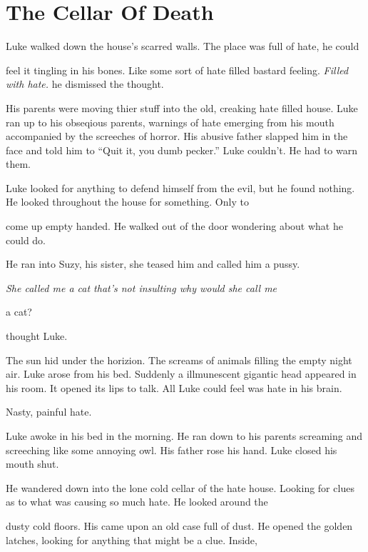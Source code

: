 \chapter{The Cellar Of Death}


Luke walked down the house's scarred walls. The place was full of
hate, he could

feel it tingling in his bones. Like some sort of hate filled
bastard feeling. {\em Filled with hate.} he dismissed the
thought.



His parents were moving thier stuff into the old, creaking hate
filled house. Luke ran up to his obseqious parents, warnings of
hate emerging from his mouth accompanied by the screeches of
horror. His abusive father slapped him in the face and told him to
``Quit it, you dumb pecker.'' Luke couldn't. He had to warn
them.



Luke looked for anything to defend himself from the evil, but he
found nothing. He looked throughout the house for something. Only
to

come up empty handed. He walked out of the door wondering about
what he could do.



He ran into Suzy, his sister, she teased him and called him a
pussy. {\em She called me a cat that's not insulting why would she
call me

a cat?} thought Luke.



The sun hid under the horizion. The screams of animals filling the
empty night air. Luke arose from his bed. Suddenly a illmunescent
gigantic head appeared in his room. It opened its lips to talk. All
Luke could feel was hate in his brain.

Nasty, painful hate.



Luke awoke in his bed in the morning. He ran down to his parents
screaming and screeching like some annoying owl. His father rose
his hand. Luke closed his mouth shut.



He wandered down into the lone cold cellar of the hate house.
Looking for clues as to what was causing so much hate. He looked
around the

dusty cold floors. His came upon an old case full of dust. He
opened the golden latches, looking for anything that might be a
clue. Inside,

